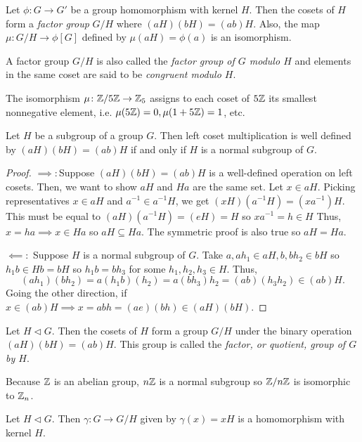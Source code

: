 \begin{theorem}
    Let $\phi\colon G\to G'$ be a group homomorphism with kernel $H$. Then the cosets of $H$ form a \emph{factor group} $G/H$ where $(aH)(bH) = (ab)H$. Also, the map $\mu\colon G/H\to\phi[G]$ defined by $\mu(aH) = \phi(a)$ is an isomorphism.

    A factor group $G/H$ is also called the \emph{factor group of $G$ modulo $H$} and elements in the same coset are said to be \emph{congruent modulo $H$}.
\end{theorem}
\begin{example}
    The isomorphism $\mu\colon\mathbb{Z}/5\mathbb{Z}\to\mathbb{Z}_5$ assigns to each coset of $5\mathbb{Z}$ its smallest nonnegative element, i.e. $\mu(5\mathbb{Z})=0, \mu(1+5\mathbb{Z})=1$, etc.
\end{example}
\begin{theorem}
    Let $H$ be a subgroup of a group $G$. Then left coset multiplication is well defined by $(aH)(bH)=(ab)H$ if and only if $H$ is a normal subgroup of $G$.
\end{theorem}
\begin{proof}
    $\implies\colon$Suppose $(aH)(bH)=(ab)H$ is a well-defined operation on left cosets. Then, we want to show $aH$ and $Ha$ are the same set. Let $x\in aH$. Picking representatives $x \in aH$ and $a^{-1} \in a^{-1}H$, we get $(xH)(a^{-1}H) = (xa^{-1})H$. This must be equal to $(aH)(a^{-1}H) = (eH) = H$ so $xa^{-1} = h \in H$ Thus, $x = ha \implies x \in Ha$ so $aH\subseteq Ha$. The symmetric proof is also true so $aH = Ha$.

    $\impliedby\colon$ Suppose $H$ is a normal subgroup of $G$. Take $a,ah_1 \in aH, b,bh_2 \in bH$ so $h_1b \in Hb = bH$ so $h_1b=bh_3$ for some $h_1,h_2,h_3 \in H$. Thus, $$(ah_1)(bh_2)=a(h_1b)(h_2)=a(bh_3)h_2=(ab)(h_3h_2) \in (ab)H.$$ Going the other direction, if $x \in (ab)H \implies x = abh = (ae)(bh) \in (aH)(bH).$
\end{proof}
\begin{definition}
    Let $H \vartriangleleft G$. Then the cosets of $H$ form a group $G/H$ under the binary operation $(aH)(bH)=(ab)H$. This group is called the \emph{factor, or quotient, group of $G$ by $H$}.
\end{definition}
\begin{example}
    Because $\mathbb{Z}$ is an abelian group, $n\mathbb{Z}$ is a normal subgroup so $\mathbb{Z}/n\mathbb{Z}$ is isomorphic to $\mathbb{Z}_n$. 
\end{example}
\begin{theorem}
    Let $H \vartriangleleft G$. Then $\gamma\colon G\to G/H$ given by $\gamma(x) = xH$ is a homomorphism with kernel $H$.
\end{theorem}
